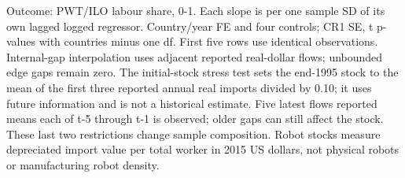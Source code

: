 \begin{table}[htbp]\centering
\caption{H1a. Sensitivity to construction of the robot-import stock proxy}
\label{tab:measurement_robots}
\small
{}
\begin{tablenotes}\footnotesize Outcome: PWT/ILO labour share, 0-1. Each slope is per one sample SD of its own lagged logged regressor. Country/year FE and four controls; CR1 SE, t p-values with countries minus one df. First five rows use identical observations. Internal-gap interpolation uses adjacent reported real-dollar flows; unbounded edge gaps remain zero. The initial-stock stress test sets the end-1995 stock to the mean of the first three reported annual real imports divided by 0.10; it uses future information and is not a historical estimate. Five latest flows reported means each of t-5 through t-1 is observed; older gaps can still affect the stock. These last two restrictions change sample composition. Robot stocks measure depreciated import value per total worker in 2015 US dollars, not physical robots or manufacturing robot density.\end{tablenotes}
\end{table}